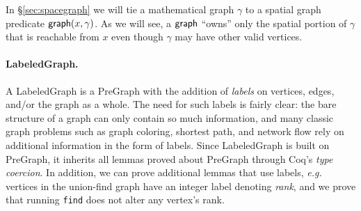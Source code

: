 \hide
{In \S\ref{sec:spacegraph} we will tie a mathematical graph $\gamma$ to 
a spatial graph predicate
$\mathsf{graph}(x, \gamma)$.   As we will see, a $\mathsf{graph}$ ``owns'' only the
spatial portion of $\gamma$ that is reachable
from $x$ even though $\gamma$ may have other valid vertices.
} %



\vspace{-0.75ex}

\paragraph{LabeledGraph.}
A LabeledGraph is a PreGraph with the addition of \emph{labels} on
vertices, edges, and/or the graph as a whole. The need for such labels
is fairly clear: the bare structure of a graph can only contain so
much information, and many classic graph problems such as graph
coloring, shortest path, and network flow rely on additional
information in the form of labels. Since
LabeledGraph is built on PreGraph, it inherits all lemmas proved about
PreGraph through Coq's \emph{type coercion}. 
In addition, we can prove additional lemmas that use labels,
\emph{e.g.} vertices in the union-find graph have an integer label denoting \emph{rank},
and we prove that running \texttt{find} does not alter any vertex's rank.

\iffalse
\paragraph{LabeledGraph.}
A LabeledGraph is a PreGraph with the addition of \emph{labels} on 
vertices, edges, and/or the graph as a whole. The need for such labels
is fairly clear; the bare structure of a graph can only 
contain so much information, and many classic graph problems 
such as graph coloring, shortest path, and network flow rely on 
additional information in the form of labels. In our architecture, a
LabeledGraph inherits any lemmas proved about its associated PreGraph. 
In addition, we can define additional lemmas that use labels, 
\emph{e.g.} the union-find graph has an integer label denoting \emph{rank}.
We could prove a lemma that running \texttt{find} does not alter
any vertex's rank. 
\hide{add string labels to edges and reason about a trie.}
\fi


